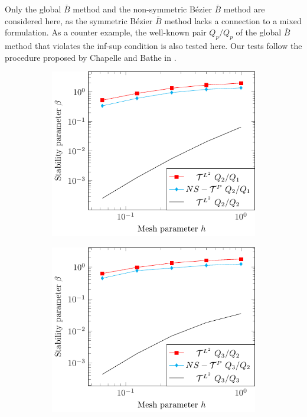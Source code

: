 \documentclass{article}
\newcommand{\Bezier}{{B\'{e}zier} }
\begin{document}
Only the global $\bar{B}$ method and the non-symmetric \Bezier $\bar{B}$ method are considered here, as the symmetric \Bezier $\bar{B}$ method lacks a connection to a mixed formulation. As a counter example, the well-known pair $Q_p/Q_p$ of the global $\bar{B}$ method that violates the inf-sup condition is also tested here. Our tests follow the procedure proposed by Chapelle and Bathe in \cite{chapelle_inf-sup_1993}.\par
\begin{figure}[htb!]
    \centering
    \begin{subfigure}[b]{0.31\linewidth}        %
        \centering
        \includegraphics[width=\linewidth]{beta_p_2}
    \end{subfigure}
    \begin{subfigure}[b]{0.31\linewidth}        %
        \centering
        \includegraphics[width=\linewidth]{beta_p_3}

\end{subfigure}
\end{figure}
\end{document}

